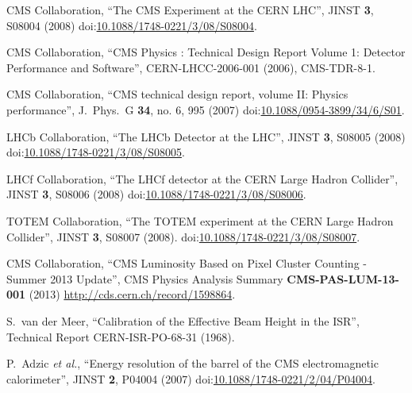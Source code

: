 \begin{thebibliography}{99}
CMS Collaboration, ``The CMS Experiment at the CERN LHC'', JINST {\bf 3}, S08004 (2008) doi:\href{http://dx.doi.org/10.1088/1748-0221/3/08/S08004}{10.1088/1748-0221/3/08/S08004}.

CMS Collaboration, ``CMS Physics : Technical Design Report Volume 1: Detector Performance and Software'', CERN-LHCC-2006-001 (2006), CMS-TDR-8-1. 

CMS Collaboration, ``CMS technical design report, volume II: Physics performance'', J.\ Phys.\ G {\bf 34}, no. 6, 995 (2007) doi:\href{http://dx.doi.org/10.1088/0954-3899/34/6/S01}{10.1088/0954-3899/34/6/S01}.

LHCb Collaboration, ``The LHCb Detector at the LHC'', JINST {\bf 3}, S08005 (2008) doi:\href{http://dx.doi.org/10.1088/1748-0221/3/08/S08005}{10.1088/1748-0221/3/08/S08005}.

LHCf Collaboration, ``The LHCf detector at the CERN Large Hadron Collider'', JINST {\bf 3}, S08006 (2008) doi:\href{http://dx.doi.org/10.1088/1748-0221/3/08/S08006}{10.1088/1748-0221/3/08/S08006}.

TOTEM Collaboration, ``The TOTEM experiment at the CERN Large Hadron Collider'', JINST {\bf 3}, S08007 (2008). doi:\href{http://dx.doi.org/10.1088/1748-0221/3/08/S08007}{10.1088/1748-0221/3/08/S08007}.

CMS Collaboration, ``CMS Luminosity Based on Pixel Cluster Counting - Summer 2013 Update'', CMS Physics Analysis Summary {\bf CMS-PAS-LUM-13-001} (2013) \url{http://cds.cern.ch/record/1598864}.

S.~van der Meer, ``Calibration of the Effective Beam Height in the ISR'', Technical Report CERN-ISR-PO-68-31 (1968).



P.~Adzic {\it et al.}, ``Energy resolution of the barrel of the CMS electromagnetic calorimeter'', JINST {\bf 2}, P04004 (2007) doi:\href{http://dx.doi.org/10.1088/1748-0221/2/04/P04004}{10.1088/1748-0221/2/04/P04004}. 


\end{thebibliography}
